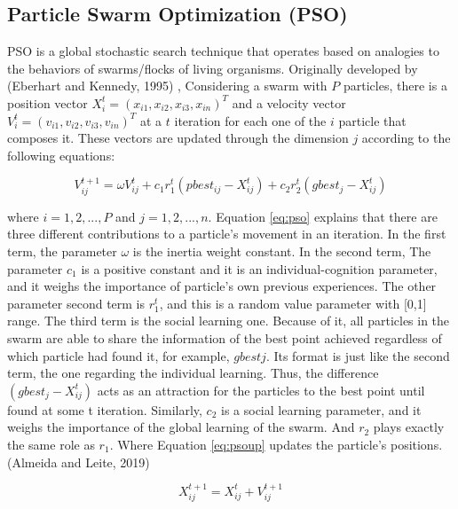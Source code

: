 \documentclass[]{elsarticle} %
\begin{document}
\begin{eqution}
\hypertarget{particle-swarm-optimization-pso}{%
\subsection{Particle Swarm Optimization (PSO)}\label{particle-swarm-optimization-pso}}

PSO is a global stochastic search technique that operates based on analogies to the behaviors of swarms/flocks of living organisms. Originally developed by (Eberhart and Kennedy, 1995) , Considering a swarm with \(P\) particles, there is a position vector \(X_{i}^{t}=(x_{i1},x_{i2}, x_{i3},x_{in})^T\) and a velocity vector \(V^t_i=(v_{i1},v_{i2},v_{i3},v_{in})^T\) at a \(t\) iteration for each one of the \(i\) particle that composes it. These vectors are updated through the dimension \(j\) according to the following equations:

\begin{equation}
V^{t+1}_{ij} = \omega V^{t}_{ij} + c_{1}r_{1}^{t}(pbest_{ij}-X_{ij}^t) + c_2r_2^t(gbest_j-X_{ij}^{t})
\label{eq:pso}
\end{equation}

where \(i=1,2,..., P\) and \(j =1,2,...,n\). Equation \eqref{eq:pso} explains that there are three different contributions to a particle's movement in an iteration. In the first term, the parameter \(\omega\) is the inertia weight constant. In the second term, The parameter \(c_1\) is a positive constant and it is an individual-cognition parameter, and it weighs the importance of particle's own previous experiences. The other parameter second term is \(r_1^t\), and this is a random value parameter with {[}0,1{]} range. The third term is the social learning one. Because of it, all particles in the swarm are able to share the information of the best point achieved regardless of which particle had found it, for example, \(gbestj\). Its format is just like the second term, the one regarding the individual learning. Thus, the difference \((gbest_j - X^t_{ij})\) acts as an attraction for the particles to the best point until found at some t iteration. Similarly, \(c_2\) is a social learning parameter, and it weighs the importance of the global learning of the swarm. And \(r_2\) plays exactly the same role as \(r_1\). Where Equation \eqref{eq:psoup} updates the particle's positions. (Almeida and Leite, 2019)

\begin{equation}
X_{ij}^{t+1} = X_{ij}^{t} + V_{ij}^{t+1}
\label{eq:psoup}
\end{equation}


\end{eqution}
\end{document}
